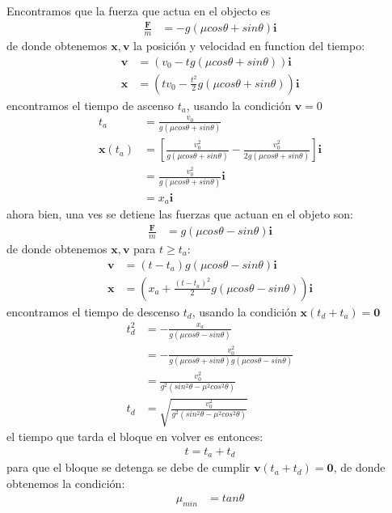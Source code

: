 \documentclass{article}
\begin{document}
\begin{tcolorbox}
    Encontramos que la fuerza que actua en el objecto es
    \begin{align*}
        \frac{\bm{F}}{m} &=-g(\mu cos\theta + sin\theta) \bm{i}
    \end{align*}
    de donde obtenemos $\bm{x,v}$ la posición y velocidad en function del tiempo:
    \begin{align*}
        \bm{v} &=(v_0 - tg(\mu cos\theta + sin\theta)) \bm{i} \\
        \bm{x} &=(tv_0 -\frac{t^2}{2}g(\mu cos\theta + sin\theta))\bm{i}
    \end{align*}
    encontramos el tiempo de ascenso $t_a$, usando la condición $\bm{v} = 0$
    \begin{align*}
        t_a &= \frac{v_0}{g(\mu cos\theta + sin\theta)} \\
        \bm{x}(t_a) 
        &= \left[\frac{v_0^2}{g(\mu cos\theta + sin\theta)} - \frac{v_0^2}{2g(\mu cos\theta + sin\theta)} \right] \bm{i} \\
        &= \frac{v_0^2}{g(\mu cos\theta + sin\theta)} \bm{i} \\
        &= x_a\bm{i}
    \end{align*}
    ahora bien, una ves se detiene las fuerzas que actuan en el objeto son:
    \begin{align*}
        \frac{\bm{F}}{m} &= g(\mu cos\theta-sin\theta)\bm{i}
    \end{align*}
    de donde obtenemos $\bm{x,v}$ para $t \ge t_a$:
    \begin{align*}
        \bm{v} 
        &= (t-t_a)g(\mu cos\theta-sin\theta)\bm{i} \\
        \bm{x} 
        &= (x_a + \frac{(t-t_a)^2}{2}g(\mu cos\theta-sin\theta))\bm{i}
    \end{align*}
    encontramos el tiempo de descenso $t_d$, usando la condición $\bm{x}(t_d + t_a) = \bm{0}$
    \begin{align*}
        t_d^2 
        &= -\frac{x_a}{g(\mu cos\theta - sin\theta)} \\
        &= -\frac{v_0^2}{g(\mu cos\theta + sin\theta)g(\mu cos\theta - sin\theta)} \\
        &= \frac{v_0^2}{g^2(sin^2\theta - \mu^2cos^2\theta)} \\
        t_d 
        &= \sqrt{\frac{v_0^2}{g^2(sin^2\theta - \mu^2cos^2\theta)}} 
    \end{align*}
    el tiempo que tarda el bloque en volver es entonces:
    \begin{align*}
        t = t_a + t_d
    \end{align*}
    para que el bloque se detenga se debe de cumplir $\bm{v}(t_a + t_d) = \bm{0}$, de donde 
    obtenemos la condición:
    \begin{align*}
        \mu_{min} &= tan\theta
    \end{align*}
\end{tcolorbox}
\end{document}
